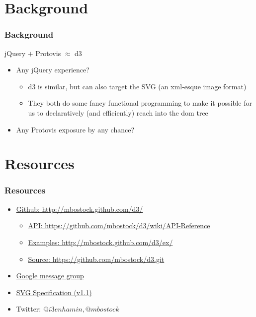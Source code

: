 \documentclass{beamer}
\begin{document}
\section{Background}

\begin{frame}
    \frametitle{Background}
    \begin{block}{jQuery $+$ Protovis $\approx$ d3}
\pause
        \begin{itemize}
        \item Any jQuery experience?
\pause
            \begin{itemize}
            \item d3 is similar, but can also target the SVG (an xml-esque image format)
\pause
            \item They both do some fancy functional programming to make it possible 
                  for us to declaratively (and efficiently) reach into the dom tree
            \end{itemize}
\pause
       \item Any Protovis exposure by any chance?
       \end{itemize}
    \end{block}
\end{frame}



\section{Resources}

\begin{frame}
    \frametitle{Resources}
\pause
        \begin{itemize}
        \item \href{http://mbostock.github.com/d3/}{\underline{Github}: http://mbostock.github.com/d3/}
\pause
            \begin{itemize}
            \item \href{https://github.com/mbostock/d3/wiki/API-Reference}{\underline{API}: https://github.com/mbostock/d3/wiki/API-Reference}
\pause
            \item \href{http://mbostock.github.com/d3/ex/}{\underline{Examples}: http://mbostock.github.com/d3/ex/}
\pause
            \item \href{https://github.com/mbostock/d3.git}{\underline{Source}: https://github.com/mbostock/d3.git}
            \end{itemize}
\pause
        \item \href{http://groups.google.com/group/d3-js?pli=1}{Google message group}
\pause
        \item \href{http://www.w3.org/TR/SVG/}{SVG Specification (v1.1)}
\pause
        \item Twitter: $@i3enhamin, @mbostock$
        \end{itemize}
\end{frame}
\end{document}

